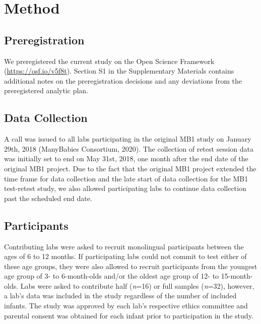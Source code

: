 \documentclass[
  man,floatsintext]{apa6}
\begin{document}
\hypertarget{method}{%
\section{Method}\label{method}}

\hypertarget{preregistration}{%
\subsection{Preregistration}\label{preregistration}}

We preregistered the current study on the Open Science Framework (\url{https://osf.io/v5f8t}). Section S1 in the Supplementary Materials contains additional notes on the preregistration decisions and any deviations from the preregistered analytic plan.

\hypertarget{data-collection}{%
\subsection{Data Collection}\label{data-collection}}

A call was issued to all labs participating in the original MB1 study on January 29th, 2018 (ManyBabies Consortium, 2020). The collection of retest session data was initially set to end on May 31st, 2018, one month after the end date of the original MB1 project. Due to the fact that the original MB1 project extended the time frame for data collection and the late start of data collection for the MB1 test-retest study, we also allowed participating labs to continue data collection past the scheduled end date.

\hypertarget{participants}{%
\subsection{Participants}\label{participants}}

Contributing labs were asked to recruit monolingual participants between the ages of 6 to 12 months. If participating labs could not commit to test either of these age groups, they were also allowed to recruit participants from the youngest age group of 3- to 6-month-olds and/or the oldest age group of 12- to 15-month-olds.
Labs were asked to contribute half (\emph{n}=16) or full samples (\emph{n}=32), however, a lab's data was included in the study regardless of the number of included infants.
The study was approved by each lab's respective ethics committee and parental consent was obtained for each infant prior to participation in the study.
\end{document}
